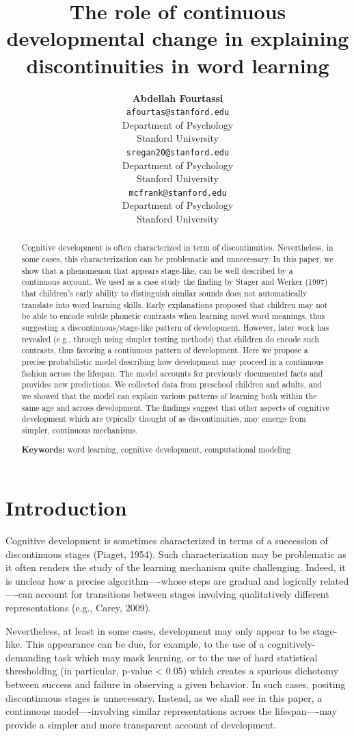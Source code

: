 \documentclass[10pt, letterpaper]{article}
\title{The role of continuous developmental change in explaining
discontinuities in word learning}
\author{{\large \bf Abdellah Fourtassi} \\ \texttt{afourtas@stanford.edu} \\ Department of Psychology \\ Stanford University \And {\large \bf Sophie Regan} \\ \texttt{sregan20@stanford.edu} \\ Department of Psychology \\ Stanford University \And {\large \bf Michael C. Frank} \\ \texttt{mcfrank@stanford.edu} \\ Department of Psychology \\ Stanford University}
\begin{document}
\maketitle

\begin{abstract}
Cognitive development is often characterized in term of discontinuities.
Nevertheless, in some cases, this characterization can be problematic
and unnecessary. In this paper, we show that a phenomenon that appears
stage-like, can be well described by a continuous account. We used as a
case study the finding by Stager and Werker (1997) that children's early
ability to distinguish similar sounds does not automatically translate
into word learning skills. Early explanations proposed that children may
not be able to encode subtle phonetic contrasts when learning novel word
meanings, thus suggesting a discontinuous/stage-like pattern of
development. However, later work has revealed (e.g., through using
simpler testing methods) that children do encode such contrasts, thus
favoring a continuous pattern of development. Here we propose a precise
probabilistic model describing how development may proceed in a
continuous fashion across the lifespan. The model accounts for
previously documented facts and provides new predictions. We collected
data from preschool children and adults, and we showed that the model
can explain various patterns of learning both within the same age and
across development. The findings suggest that other aspects of cognitive
development which are typically thought of as discontinuities, may
emerge from simpler, continuous mechanisms.

\textbf{Keywords:}
word learning, cognitive development, computational modeling
\end{abstract}

\section{Introduction}\label{introduction}

Cognitive development is sometimes characterized in terms of a
succession of discontinuous stages (Piaget, 1954). Such characterization
may be problematic as it often renders the study of the learning
mechanism quite challenging. Indeed, it is unclear how a precise
algorithm----whose steps are gradual and logically related----can
account for transitions between stages involving qualitatively different
representations (e.g., Carey, 2009).

Nevertheless, at least in some cases, development may only appear to be
stage-like. This appearance can be due, for example, to the use of a
cognitively-demanding task which may mask learning, or to the use of
hard statistical thresholding (in particular, p-value \textless{} 0.05)
which creates a spurious dichotomy between success and failure in
observing a given behavior. In such cases, positing discontinuous stages
is unnecessary. Instead, as we shall see in this paper, a continuous
model----involving similar representations across the lifespan----may
provide a simpler and more transparent account of development.
\end{document}
